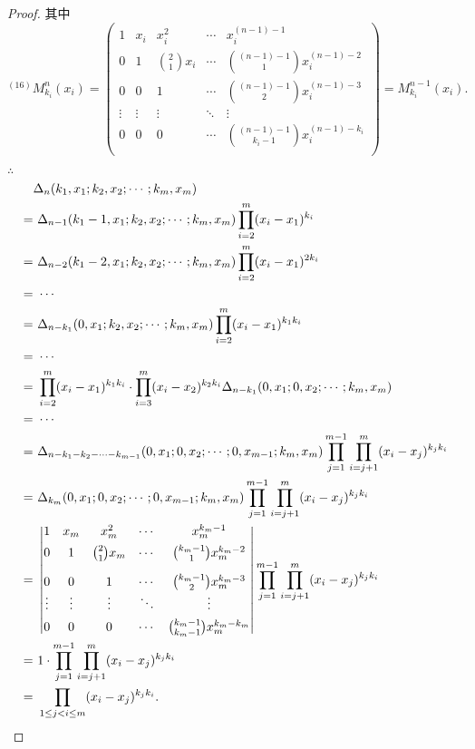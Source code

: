\documentclass{ctexart}
\begin{document}
\begin{proof}
    其中
    \[^{(16)}M_{k_i}^n(x_i)=\begin{pmatrix}
        1 & x_i & x_i^2 & \cdots & x_i^{(n-1)-1} \\[4pt]
        0 & 1 & \binom{2}{1}x_i & \cdots & \binom{(n-1)-1}{1}x_i^{(n-1)-2} \\[10pt]
        0 & 0 & 1 & \cdots & \binom{(n-1)-1}{2}x_i^{(n-1)-3} \\
        \vdots & \vdots & \vdots & \ddots & \vdots \\[4pt]
        0 & 0 & 0 & \cdots & \binom{(n-1)-1}{k_i-1}x_i^{(n-1)-k_i} \\
    \end{pmatrix}=M^{n-1}_{k_i}(x_i).\]

    $\therefore$
    \begin{align*}
        & \Delta_n(k_1,x_1;k_2,x_2;\cdots;k_m,x_m) \\
        = & \ \Delta_{n-1}(k_1-1,x_1;k_2,x_2;\cdots;k_m,x_m)\prod\limits_{i=2}^m(x_i-x_1)^{k_i} \\
        = & \ \Delta_{n-2}(k_1-2,x_1;k_2,x_2;\cdots;k_m,x_m)\prod\limits_{i=2}^m(x_i-x_1)^{2k_i} \\
        = & \ \cdots \\
        = & \ \Delta_{n-k_1}(0,x_1;k_2,x_2;\cdots;k_m,x_m)\prod\limits_{i=2}^m(x_i-x_1)^{k_1k_i} \\
        = & \ \cdots \\
        = & \ \prod\limits_{i=2}^m(x_i-x_1)^{k_1k_i}\cdot\prod\limits_{i=3}^m(x_i-x_2)^{k_2k_i}\Delta_{n-k_1}(0,x_1;0,x_2;\cdots;k_m,x_m) \\
        = & \ \cdots \\
        = & \ \Delta_{n-k_1-k_2-\cdots-k_{m-1}}(0,x_1;0,x_2;\cdots;0,x_{m-1};k_m,x_m)\prod_{j=1}^{m-1}\prod\limits_{i=j+1}^m(x_i-x_j)^{k_jk_i} \\
        = & \ \Delta_{k_m}(0,x_1;0,x_2;\cdots;0,x_{m-1};k_m,x_m)\prod_{j=1}^{m-1}\prod\limits_{i=j+1}^m(x_i-x_j)^{k_jk_i} \\
        = & \ \begin{vmatrix}
            1 & x_m & x_m^2 & \cdots & x_m^{k_m-1} \\[4pt]
            0 & 1 & \binom{2}{1}x_m & \cdots & \binom{k_m-1}{1}x_m^{k_m-2} \\[10pt]
            0 & 0 & 1 & \cdots & \binom{k_m-1}{2}x_m^{k_m-3} \\
            \vdots & \vdots & \vdots & \ddots & \vdots \\[4pt]
            0 & 0 & 0 & \cdots & \binom{k_m-1}{k_m-1}x_m^{k_m-k_m} \\
        \end{vmatrix}\prod_{j=1}^{m-1}\prod\limits_{i=j+1}^m(x_i-x_j)^{k_jk_i} \\
        = & \ 1\cdot\prod_{j=1}^{m-1}\prod\limits_{i=j+1}^m(x_i-x_j)^{k_jk_i} \\
        = & \ \prod\limits_{1\leq j<i\leq m}(x_i-x_j)^{k_jk_i}.\qedhere
    \end{align*}
\end{proof}
\end{document}
